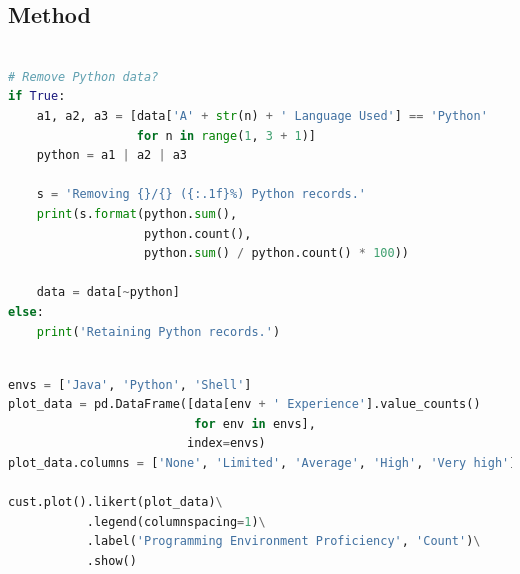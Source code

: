 \subsection{Method}

  \begin{lstlisting}[float=ht,
                     language=Python,
                     basicstyle=\ttfamily\footnotesize,
                     label=EXCLUDE_PYTHON,
                     caption={Exclusion of Python data using pandas \texttt{DataFrame} overloaded operators and slicing.}]

# Remove Python data?
if True:
    a1, a2, a3 = [data['A' + str(n) + ' Language Used'] == 'Python'
                  for n in range(1, 3 + 1)]
    python = a1 | a2 | a3
    
    s = 'Removing {}/{} ({:.1f}%) Python records.'
    print(s.format(python.sum(),
                   python.count(),
                   python.sum() / python.count() * 100))
    
    data = data[~python]
else:
    print('Retaining Python records.')
  \end{lstlisting}
  
  \begin{lstlisting}[float=ht,
                     language=Python,
                     basicstyle=\ttfamily\footnotesize,
                     label=CUST_PLOT_SIMPLE,
                     caption={Usage of pandas and custom plotting functions in drawing a diverging stacked bar chart -- specifically that for Figure~\ref{PROG_ENV_PROF}.}]

envs = ['Java', 'Python', 'Shell']
plot_data = pd.DataFrame([data[env + ' Experience'].value_counts()
                          for env in envs],
                         index=envs)
plot_data.columns = ['None', 'Limited', 'Average', 'High', 'Very high']

cust.plot().likert(plot_data)\
           .legend(columnspacing=1)\
           .label('Programming Environment Proficiency', 'Count')\
           .show()
  \end{lstlisting}
  
